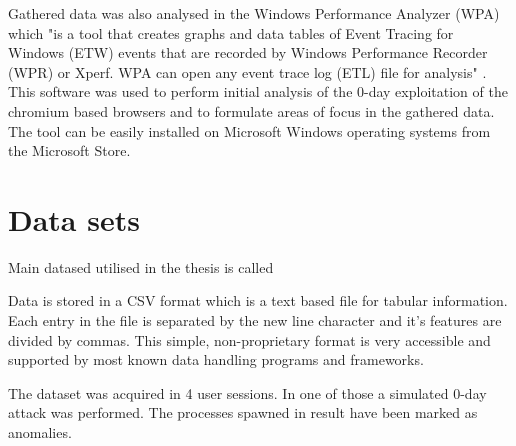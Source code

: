 \documentclass[a4paper,twoside,12pt]{book}
\begin{document}
Gathered data was also analysed in the Windows Performance Analyzer (WPA) which "is a tool that 
creates graphs and data tables of Event Tracing for Windows (ETW) events that are recorded 
by Windows Performance Recorder (WPR) or Xperf. WPA can open any event trace log (ETL) file 
for analysis" \cite{bib:wpa}. This software was used to perform initial analysis of the 0-day 
exploitation of the chromium based browsers and to formulate areas of focus in the gathered data. 
The tool can be easily installed on Microsoft Windows operating systems from the Microsoft Store.



\section{Data sets}

Main datased utilised in the thesis is called 

Data is stored in a CSV format which is a text based file for tabular information.  
Each entry in the file is separated by the new line character and it's features are divided 
by commas. This simple, non-proprietary format is very accessible and supported by most 
known data handling programs and frameworks. 

The dataset was acquired in 4 user sessions. In one of those a simulated 0-day attack was 
performed. The processes spawned in result have been marked as anomalies. 
\end{document}
